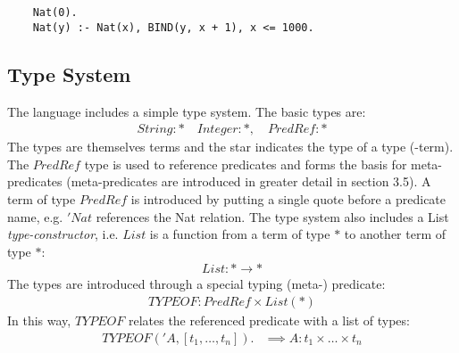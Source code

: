 \begin{verbatim}
	Nat(0).
	Nat(y) :- Nat(x), BIND(y, x + 1), x <= 1000.
\end{verbatim}


\subsection{Type System}
The language includes a simple type system. The basic types are:
\vspace*{-10pt}
\begin{align*}
	String : * \quad Integer : *, \quad PredRef : * 
\end{align*}
\noindent
The types are themselves terms and the star indicates the type of a type (-term). The $PredRef$ type is used to reference predicates and forms the basis for meta-predicates (meta-predicates are introduced in greater detail in section 3.5). A term of type $PredRef$ is introduced by putting a single quote before a predicate name, e.g. $'Nat$ references the Nat relation. The type system also includes a List \textit{type-constructor}, i.e. $List$ is a function from a term of type $*$ to another term of type $*$:
\vspace*{-15pt}
\begin{align*}
	List : * \rightarrow *
\end{align*}
\noindent
The types are introduced through a special typing (meta-) predicate:
\vspace*{-5pt}
\begin{align*}
	TYPEOF : PredRef \times List(*)
\end{align*}
In this way, $TYPEOF$ relates the referenced predicate with a list of types:
\begin{align*}
TYPEOF('A, [t_1, \ldots, t_n]). &\implies A : t_1 \times \ldots \times t_n\\
\end{align*}
\vspace*{-\baselineskip}\vspace*{-\baselineskip}\vspace*{-10pt}
